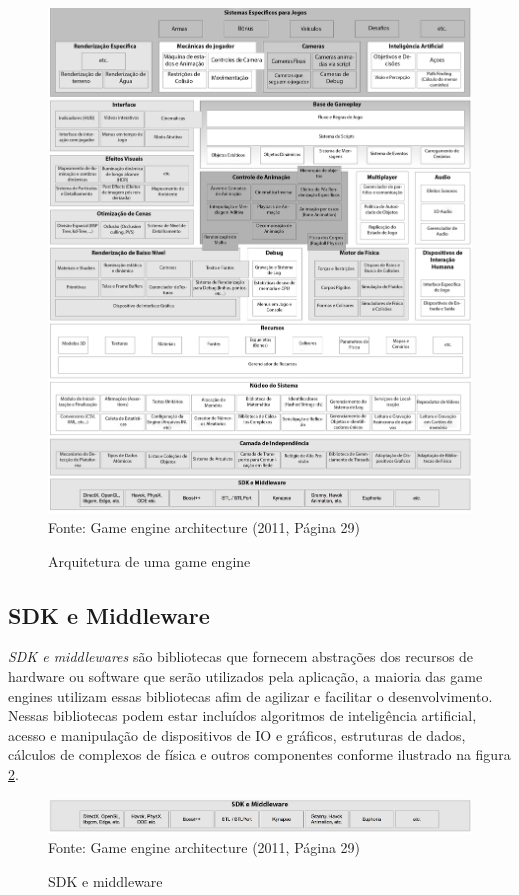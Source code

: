 \documentclass[12pt,	openright, twoside,	a4paper, english, french, spanish, brazil]{abntex2}
\begin{document}
\begin{figure}[H]
\centering
\caption{Arquitetura de uma game engine}
\includegraphics[width=17cm]{imagens/arch.png}
\\
\small{Fonte: Game engine architecture (2011, Página 29)}
\label{figura:arch}
\end{figure}

\subsection{SDK e Middleware}
\textit{SDK e middlewares} são bibliotecas que fornecem abstrações dos recursos de hardware ou software que serão utilizados pela aplicação, a maioria das game engines utilizam essas bibliotecas afim de agilizar e facilitar o desenvolvimento. Nessas bibliotecas podem estar  incluídos algoritmos de inteligência artificial, acesso e manipulação de dispositivos de IO e gráficos, estruturas de dados, cálculos de complexos de física e outros componentes conforme ilustrado na figura \ref{figura:arch_sdk}.

\begin{figure}[H]
\centering
\caption{SDK e middleware}
\includegraphics[width=16cm]{imagens/arch-sdk.png}
\\
\small{Fonte: Game engine architecture (2011, Página 29)}
\label{figura:arch_sdk}
\end{figure}
\end{document}
